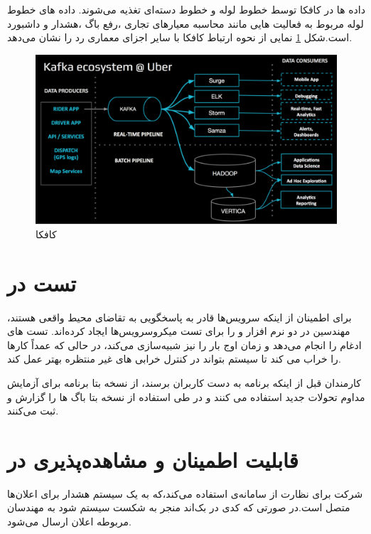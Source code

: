 داده ها در کافکا توسط خطوط لوله  و خطوط دسته‌ای تغذیه می‌شوند. داده های خطوط لوله مربوط به فعالیت هایی مانند محاسبه معیارهای تجاری ،رفع باگ ،هشدار و داشبورد است.شکل \ref{fig:kafka} نمایی از نحوه ارتباط کافکا با سایر اجزای معماری رد  را نشان می‌دهد.\cite{kafka}

\begin{figure}[h]
\centering
\includegraphics[scale=0.3]{kafka.png}
\caption{کافکا}
\label{fig:kafka}
\end{figure}


\section{تست در }
برای اطمینان از اینکه سرویس‌ها قادر به پاسخگویی به تقاضای محیط واقعی هستند، مهندسین در   دو نرم افزار  و  را برای تست میکروسرویس‌‌ها ایجاد کرده‌اند. تست های ادغام را انجام می‌دهد و زمان اوج بار را نیز شبیه‌سازی می‌کند، در حالی که  عمداً کارها را خراب می کند تا سیستم بتواند در کنترل خرابی های غیر منتظره بهتر عمل کند.

کارمندان  قبل از اینکه برنامه به دست کاربران برسند، از نسخه بتا برنامه برای آزمایش مداوم تحولات جدید استفاده می کنند و در طی استفاده از نسخه بتا باگ ها را گزارش و ثبت می‌کنند.\cite{techstack}


\section{قابلیت اطمینان و مشاهده‌پذیری در }
شرکت  برای نظارت از سامانه‌ی \cite{Nagios} استفاده می‌کند،که به یک سیستم هشدار برای اعلان‌ها متصل است.در صورتی که کدی در بک‌اند منجر به شکست سیستم شود به مهندسان مربوطه اعلان ارسال می‌شود.

